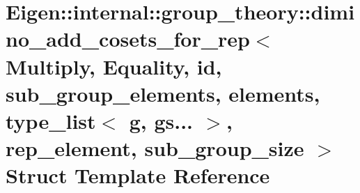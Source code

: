 \hypertarget{struct_eigen_1_1internal_1_1group__theory_1_1dimino__add__cosets__for__rep_3_01_multiply_00_01_e632095b5337826777d5a1f8cb0eea391}{}\section{Eigen\+:\+:internal\+:\+:group\+\_\+theory\+:\+:dimino\+\_\+add\+\_\+cosets\+\_\+for\+\_\+rep$<$ Multiply, Equality, id, sub\+\_\+group\+\_\+elements, elements, type\+\_\+list$<$ g, gs... $>$, rep\+\_\+element, sub\+\_\+group\+\_\+size $>$ Struct Template Reference}
\label{struct_eigen_1_1internal_1_1group__theory_1_1dimino__add__cosets__for__rep_3_01_multiply_00_01_e632095b5337826777d5a1f8cb0eea391}
